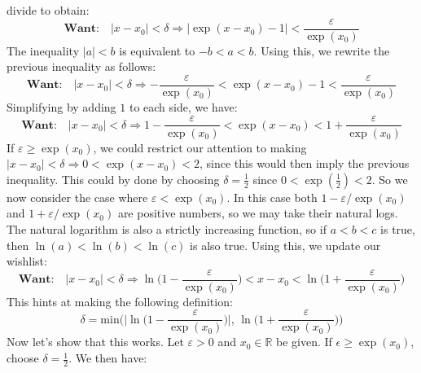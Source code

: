 \documentclass{article}
\theoremstyle{normal}
\theoremstyle{plain}
\begin{document}
    divide to obtain:
    \begin{equation}
        \textbf{Want:}\quad
        |x-x_{0}|<\delta
        \Rightarrow
        \big|\exp(x-x_{0})-1\big|<\frac{\varepsilon}{\exp(x_{0})}
    \end{equation}
    The inequality $|a|<b$ is equivalent to $-b<a<b$. Using this, we rewrite
    the previous inequality as follows:
    \begin{equation}
        \textbf{Want:}\quad
        |x-x_{0}|<\delta
        \Rightarrow
        -\frac{\varepsilon}{\exp(x_{0})}
            <\exp(x-x_{0})-1
            <\frac{\varepsilon}{\exp(x_{0})}
    \end{equation}
    Simplifying by adding $1$ to each side, we have:
    \begin{equation}
        \textbf{Want:}\quad
        |x-x_{0}|<\delta
        \Rightarrow
        1-\frac{\varepsilon}{\exp(x_{0})}
            <\exp(x-x_{0})
            <1+\frac{\varepsilon}{\exp(x_{0})}
    \end{equation}
    If $\varepsilon\geq\exp(x_{0})$, we could restrict our attention to making
    $|x-x_{0}|<\delta\Rightarrow{0}<\exp(x-x_{0})<2$, since this would then
    imply the previous inequality. This could by done by choosing
    $\delta=\frac{1}{2}$ since $0<\exp(\frac{1}{2})<2$. So we now consider the
    case where $\varepsilon<\exp(x_{0})$. In this case both
    $1-\varepsilon/\exp(x_{0})$ and $1+\varepsilon/\exp(x_{0})$ are positive
    numbers, so we may take their natural logs. The natural logarithm is
    also a strictly increasing function, so if $a<b<c$ is true, then
    $\ln(a)<\ln(b)<\ln(c)$ is also true. Using this, we update our wishlist:
    \begin{equation}
        \textbf{Want:}\quad
        |x-x_{0}|<\delta
        \Rightarrow
        \ln\big(1-\frac{\varepsilon}{\exp(x_{0})}\big)
            <x-x_{0}
            <\ln\big(1+\frac{\varepsilon}{\exp(x_{0})}\big)
    \end{equation}
    This hints at making the following definition:
    \begin{equation}
        \delta=\textrm{min}\Big(
            \big|\ln\big(1-\frac{\varepsilon}{\exp(x_{0})}\big)\big|,\,
            \ln\big(1+\frac{\varepsilon}{\exp(x_{0})}\big)
        \Big)
    \end{equation}
    Now let's show that this works. Let $\varepsilon>0$ and $x_{0}\in\mathbb{R}$
    be given. If $\epsilon\geq\exp(x_{0})$, choose $\delta=\frac{1}{2}$.
    We then have:
\end{document}
